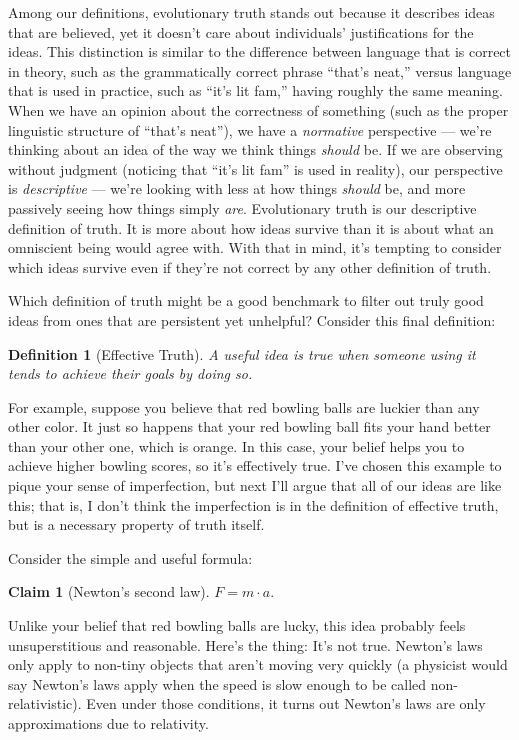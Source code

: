 \documentclass[9pt, twoside]{book}
\newtheorem*{defn}{Definition}
\newtheorem*{claim}{Claim}
\theoremstyle{argtstyle}
\begin{document}
Among our definitions, evolutionary truth stands out because it describes
ideas that are believed, yet it doesn't
care about individuals' justifications for the ideas.
This distinction is similar to the difference
between language that is correct in theory, such as the grammatically
correct phrase ``that's neat,'' versus
language that is used in practice, such as ``it's lit fam,'' having roughly the
same meaning.
When we have an opinion about the correctness of something (such as the
proper linguistic structure of ``that's
neat''), we have a {\em
normative} perspective --- we're thinking about an idea
of the way we think things {\em should} be.
If we are observing
without judgment (noticing that ``it's lit fam'' is used in reality),
our perspective is {\em descriptive} --- we're looking with
less at how things {\em should} be, and more passively
seeing how things simply {\em are}.
Evolutionary truth is our descriptive definition of truth.
It is more about how ideas survive than it is about what an omniscient being
would agree with.
With that in mind, it's tempting to consider which ideas survive even
if they're not correct by any other definition of truth.

Which definition of truth might be a good benchmark to filter out truly
good ideas from ones that are persistent yet unhelpful?
Consider this final definition:
\begin{defn}[Effective Truth]\label{d8}
    A useful idea is true when someone using it tends to achieve their goals by
    doing so.
\end{defn}

For example, suppose you believe that red bowling balls are luckier than any
other color. It just so happens that your red bowling ball fits your hand better
than your other one, which is orange.
In this case, your belief helps you to
achieve higher bowling scores, so it's effectively true.
I've chosen this example to pique your sense of imperfection, but next I'll
argue that all of our ideas are like this; that is, I don't think the
imperfection is in the definition of effective truth,
but is a necessary property of truth itself.

Consider the simple and useful formula:
\begin{claim}[Newton's second law]
    $F = m \cdot a.$
\end{claim}

Unlike your belief that red bowling balls are lucky, this idea probably feels
unsuperstitious and reasonable. Here's the thing: It's not true.
Newton's laws only apply to non-tiny
objects that aren't moving very quickly (a physicist would say Newton's laws
apply when the speed is slow enough to be called non-relativistic).
Even under those conditions,
it turns out Newton's laws are only approximations due
to relativity.
\end{document}
